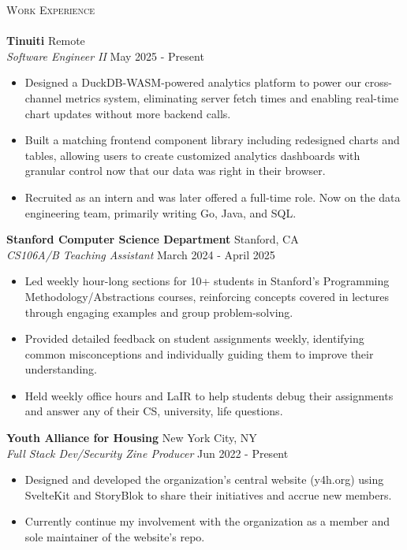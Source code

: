 \documentclass[a4paper]{article}
\newcommand{\lineunder} {
    \vspace*{-8pt} \\
    \hspace*{-18pt} \hrulefill \\
}
\newcommand{\header} [1] {
    {\hspace*{-18pt}\vspace*{6pt} \textsc{#1}}
    \vspace*{-6pt} \lineunder
}
\begin{document}
\header{Work Experience}
\textbf{Tinuiti} \hfill Remote\\
\textit{Software Engineer II} \hfill May 2025 - Present\\
\begin{itemize} \itemsep 1pt
    \item Designed a DuckDB-WASM-powered analytics platform to power our cross-channel metrics system, eliminating server fetch times and enabling real-time chart updates without more backend calls.
    \item Built a matching frontend component library including redesigned charts and tables, allowing users to create customized analytics dashboards with granular control now that our data was right in their browser.
    \item Recruited as an intern and was later offered a full-time role. Now on the data engineering team, primarily writing Go, Java, and SQL.
\end{itemize}
\textbf{Stanford Computer Science Department} \hfill Stanford, CA\\
\textit{CS106A/B Teaching Assistant} \hfill March 2024 - April 2025\\
\begin{itemize} \itemsep 1pt
    \item Led weekly hour-long sections for 10+ students in Stanford's Programming Methodology/Abstractions courses, reinforcing concepts covered in lectures through engaging examples and group problem-solving.
    \item Provided detailed feedback on student assignments weekly, identifying common misconceptions and individually guiding them to improve their understanding.
    \item Held weekly office hours and LaIR to help students debug their assignments and answer any of their CS, university, life questions.
\end{itemize}
\textbf{Youth Alliance for Housing} \hfill New York City, NY\\
\textit{Full Stack Dev/Security Zine Producer} \hfill Jun 2022 - Present\\
\begin{itemize} \itemsep 1pt
	\item Designed and developed the organization's central website (y4h.org) using SvelteKit and StoryBlok to share their initiatives and accrue new members.
    \item Currently continue my involvement with the organization as a member and sole maintainer of the website's repo.
\end{itemize}
\end{document}
